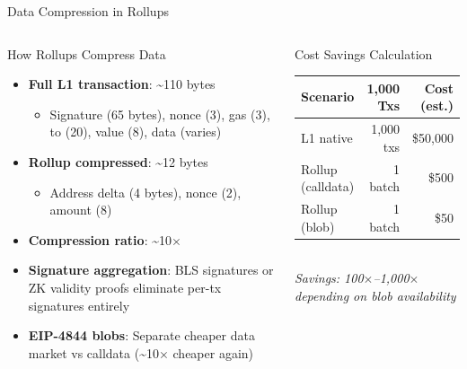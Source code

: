 \documentclass[8pt,aspectratio=169]{beamer}
\begin{document}
\begin{frame}{Data Compression in Rollups}
\begin{columns}[T]
\begin{block}{How Rollups Compress Data}
\footnotesize
\begin{itemize}
  \item \textbf{Full L1 transaction}: \textasciitilde110 bytes
    \begin{itemize}\scriptsize
      \item Signature (65 bytes), nonce (3), gas (3), to (20), value (8), data (varies)
    \end{itemize}
  \item \textbf{Rollup compressed}: \textasciitilde12 bytes
    \begin{itemize}\scriptsize
      \item Address delta (4 bytes), nonce (2), amount (8)
    \end{itemize}
  \item \textbf{Compression ratio}: \textasciitilde10$\times$
  \item \textbf{Signature aggregation}: BLS signatures or ZK validity proofs eliminate per-tx signatures entirely
  \item \textbf{EIP-4844 blobs}: Separate cheaper data market vs calldata (\textasciitilde10$\times$ cheaper again)
\end{itemize}
\end{block}
\vspace{2mm}
\begin{block}{Cost Savings Calculation}
\footnotesize
\begin{tabular}{lrr}
\toprule
Scenario & 1{,}000 Txs & Cost (est.) \\
\midrule
L1 native & 1{,}000 txs & \$50{,}000 \\
Rollup (calldata) & 1 batch & \$500 \\
Rollup (blob) & 1 batch & \$50 \\
\bottomrule
\end{tabular}\\[2mm]
\textit{\scriptsize Savings: 100$\times$--1{,}000$\times$ depending on blob availability}
\end{block}
\vspace{3mm}
\begin{tikzpicture}[scale=0.9, every node/.style={font=\scriptsize}]

\end{tikzpicture}
\end{columns}
\end{frame}
\end{document}
